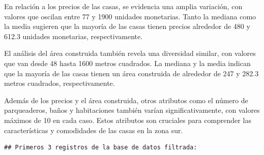 \documentclass[
]{article}
\begin{document}
En relación a los precios de las casas, se evidencia una amplia
variación, con valores que oscilan entre 77 y 1900 unidades monetarias.
Tanto la mediana como la media sugieren que la mayoría de las casas
tienen precios alrededor de 480 y 612.3 unidades monetarias,
respectivamente.

El análisis del área construida también revela una diversidad similar,
con valores que van desde 48 hasta 1600 metros cuadrados. La mediana y
la media indican que la mayoría de las casas tienen un área construida
de alrededor de 247 y 282.3 metros cuadrados, respectivamente.

Además de los precios y el área construida, otros atributos como el
número de parqueaderos, baños y habitaciones también varían
significativamente, con valores máximos de 10 en cada caso. Estos
atributos son cruciales para comprender las características y
comodidades de las casas en la zona sur.

\begin{verbatim}
## Primeros 3 registros de la base de datos filtrada:
\end{verbatim}
\end{document}
